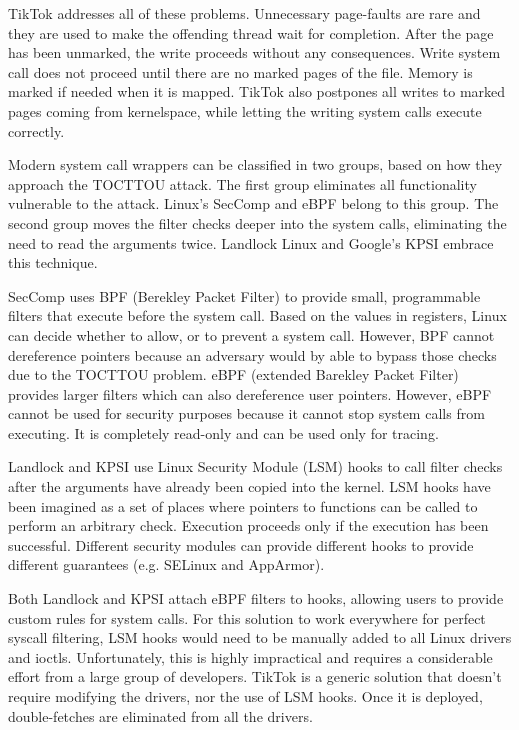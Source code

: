\documentclass[conference]{IEEEtran}
\begin{document}
TikTok addresses all of these problems. Unnecessary page-faults are rare and they are used to make the offending thread wait for completion. After the page has been unmarked,
the write proceeds without any consequences. Write system call does not proceed until there are no marked pages of the file. Memory is marked if needed when it is mapped. 
TikTok also postpones all writes to marked pages coming from kernelspace, while letting the writing system calls execute correctly.

Modern system call wrappers can be classified in two groups, based on how they approach the TOCTTOU attack. The first group eliminates all functionality vulnerable to the attack.
Linux's SecComp and eBPF belong to this group. The second group moves the filter checks deeper into the system calls, eliminating the need to read the arguments twice. Landlock
Linux and Google's KPSI embrace this technique.

SecComp uses BPF (Berekley Packet Filter) to provide small, programmable filters that execute before the system call. Based on the values in registers, Linux can decide whether
to allow, or to prevent a system call. However, BPF cannot dereference pointers because an adversary would by able to bypass those checks due to the TOCTTOU problem. eBPF 
(extended Barekley Packet Filter) provides larger filters which can also dereference user pointers. However, eBPF cannot be used for security purposes because it cannot stop
system calls from executing. It is completely read-only and can be used only for tracing.

Landlock and KPSI use Linux Security Module\cite{lsm} (LSM) hooks to call filter checks after the arguments have already been copied into the kernel. LSM hooks have been imagined
as a set of places where pointers to functions can be called to perform an arbitrary check. Execution proceeds only if the execution has been successful. Different security modules
can provide different hooks to provide different guarantees (e.g. SELinux and AppArmor).

Both Landlock and KPSI attach eBPF filters to hooks, allowing users to provide custom rules for system calls. For this solution to work everywhere for perfect syscall filtering, 
LSM hooks would need to be manually added to all Linux drivers and ioctls. Unfortunately, this is highly impractical and requires a considerable effort from a large group of developers.
TikTok is a generic solution that doesn't require modifying the drivers, nor the use of LSM hooks. Once it is deployed, double-fetches are eliminated from all the drivers.
\end{document}
